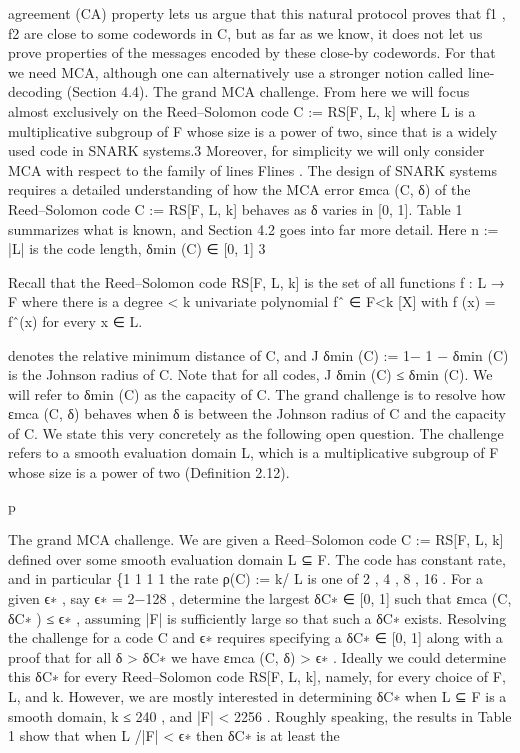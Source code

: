 \documentclass[11pt]{article}
\begin{document}
agreement (CA) property lets us argue that this natural protocol proves that f1 , f2 are close to
some codewords in C, but as far as we know, it does not let us prove properties of the messages
encoded by these close-by codewords. For that we need MCA, although one can alternatively use
a stronger notion called line-decoding (Section 4.4).
The grand MCA challenge. From here we will focus almost exclusively on the Reed–Solomon
code C := RS[F, L, k] where L is a multiplicative subgroup of F whose size is a power of two, since
that is a widely used code in SNARK systems.3 Moreover, for simplicity we will only consider
MCA with respect to the family of lines Flines .
The design of SNARK systems requires a detailed understanding of how the MCA error εmca (C, δ)
of the Reed–Solomon code C := RS[F, L, k] behaves as δ varies in [0, 1]. Table 1 summarizes what
is known, and Section 4.2 goes into far more detail. Here n := |L| is the code length, δmin (C) ∈ [0, 1]
3

Recall that the Reed–Solomon code RS[F, L, k] is the set of all functions f : L → F where there is a degree < k
univariate polynomial fˆ ∈ F<k [X] with f (x) = fˆ(x) for every x ∈ L.

denotes the relative minimum distance of C, and J δmin (C) := 1− 1 − δmin (C) is the Johnson radius
of C. Note that for all codes, J δmin (C) ≤ δmin (C). We will refer to δmin (C) as the capacity of C.
The grand challenge is to resolve how εmca (C, δ) behaves when δ is between the Johnson radius
of C and the capacity of C. We state this very concretely as the following open question. The
challenge refers to a smooth evaluation domain L, which is a multiplicative subgroup of F whose
size is a power of two (Definition 2.12).


p

The grand MCA challenge. We are given a Reed–Solomon code C := RS[F, L, k] defined
over some smooth evaluation domain
L ⊆ F. The code has constant rate, and in particular
\{1 1 1 1
the rate ρ(C) := k/ L is one of 2 , 4 , 8 , 16 . For a given ϵ∗ , say ϵ∗ = 2−128 ,
determine the largest δC∗ ∈ [0, 1] such that εmca (C, δC∗ ) ≤ ϵ∗ ,
assuming |F| is sufficiently large so that such a δC∗ exists.
Resolving the challenge for a code C and ϵ∗ requires specifying a δC∗ ∈ [0, 1] along with a proof that
for all δ > δC∗ we have εmca (C, δ) > ϵ∗ . Ideally we could determine this δC∗ for every Reed–Solomon
code RS[F, L, k], namely, for every choice of F, L, and k. However, we are mostly interested in
determining δC∗ when L ⊆ F is a smooth domain, k ≤ 240 , and |F| < 2256 .
Roughly speaking, the
results in Table 1 show that when L /|F| < ϵ∗ then δC∗ is at least the
\end{document}
